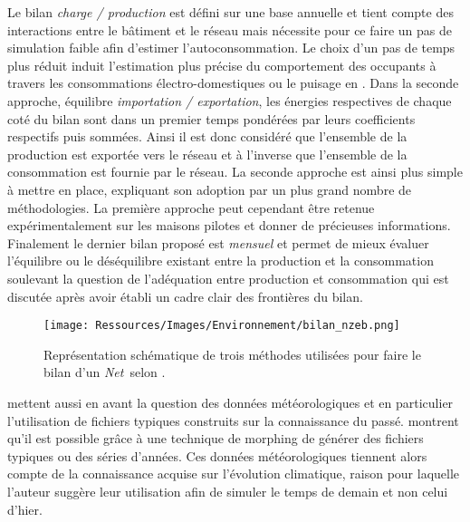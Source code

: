 Le bilan \textit{charge / production} est défini sur une base annuelle et tient compte des
interactions entre le bâtiment et le réseau mais nécessite pour ce faire un pas de
simulation faible afin d’estimer l’autoconsommation. Le choix d’un pas de temps plus
réduit induit l’estimation plus précise du comportement des occupants à travers les
consommations électro-domestiques ou le puisage en . Dans la seconde approche,
équilibre \textit{importation / exportation}, les énergies respectives de chaque coté du
bilan sont dans un premier temps pondérées par leurs coefficients respectifs puis sommées.
Ainsi il est donc considéré que l’ensemble de la production est exportée vers le réseau et
à l’inverse que l’ensemble de la consommation est fournie par le réseau. La seconde
approche est ainsi plus simple à mettre en place, expliquant son adoption par un plus
grand nombre de méthodologies. La première approche peut cependant être retenue
expérimentalement sur les maisons pilotes et donner de précieuses informations. Finalement
le dernier bilan proposé est \textit{mensuel} et permet de mieux évaluer l’équilibre ou
le déséquilibre existant entre la production et la consommation soulevant la question de
l’adéquation entre production et consommation qui est discutée après avoir établi un cadre
clair des frontières du bilan.
\begin{figure}
    \centering
    \texttt{[image: Ressources/Images/Environnement/bilan\_nzeb.png]}
    \caption[Représentation schématique du bilan d’un \textit{Net}\,]
            {Représentation schématique de trois méthodes utilisées pour faire
             le bilan d’un \textit{Net}\, selon \textcite{Sartori2012220}.}
    \label{fig:bilan_zeb}
\end{figure}

\textcite{Sartori2010} mettent aussi en avant la question des données météorologiques
et en particulier l’utilisation de fichiers typiques construits sur la connaissance
du passé. \textcite{Robert2012150} montrent qu’il est possible grâce à une technique de morphing
\parencite{Belcher200549} de générer des fichiers typiques ou des séries d’années. Ces
données météorologiques tiennent alors compte de la connaissance acquise sur l’évolution
climatique, raison pour laquelle l’auteur suggère leur utilisation afin de simuler
le temps de demain et non celui d’hier.


